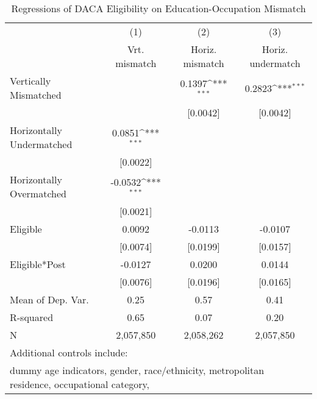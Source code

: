 \begin{table}[htbp]\centering
\def\sym#1{\ifmmode^{#1}\else\(^{#1}\)\fi}
\caption{Regressions of DACA Eligibility on Education-Occupation Mismatch}
\begin{tabular}{l*{3}{c}}
\toprule
                    &\multicolumn{1}{c}{(1)}         &\multicolumn{1}{c}{(2)}         &\multicolumn{1}{c}{(3)}         \\
                    &Vrt. mismatch         &Horiz. mismatch         &Horiz. undermatch         \\
\midrule
Vertically Mismatched&                     &      0.1397\sym{***}&      0.2823\sym{***}\\
                    &                     &    [0.0042]         &    [0.0042]         \\
\addlinespace
Horizontally Undermatched&      0.0851\sym{***}&                     &                     \\
                    &    [0.0022]         &                     &                     \\
\addlinespace
Horizontally Overmatched&     -0.0532\sym{***}&                     &                     \\
                    &    [0.0021]         &                     &                     \\
\addlinespace
Eligible            &      0.0092         &     -0.0113         &     -0.0107         \\
                    &    [0.0074]         &    [0.0199]         &    [0.0157]         \\
\addlinespace
Eligible*Post       &     -0.0127         &      0.0200         &      0.0144         \\
                    &    [0.0076]         &    [0.0196]         &    [0.0165]         \\
\midrule
Mean of Dep. Var.   &        0.25         &        0.57         &        0.41         \\
R-squared           &        0.65         &        0.07         &        0.20         \\
N                   &   2,057,850         &   2,058,262         &   2,057,850         \\
\bottomrule
\multicolumn{4}{l}{\footnotesize Additional controls include:}\\
\multicolumn{4}{l}{\footnotesize dummy age indicators, gender, race/ethnicity, metropolitan residence, occupational category,}\\

\end{tabular}
\end{table}
